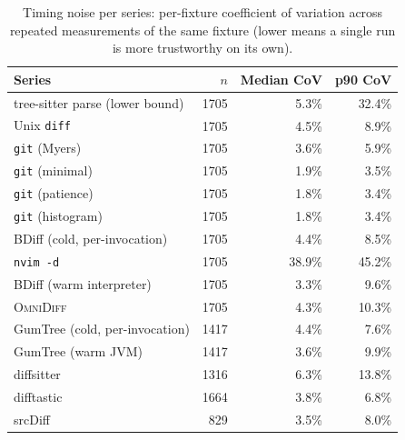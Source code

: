 \begin{table}
  \caption{Timing noise per series: per-fixture coefficient of variation across repeated measurements of the same fixture (lower means a single run is more trustworthy on its own).}
  \label{tab:variance}
  \begin{tabular}{lrrr}
    \toprule
    Series & $n$ & Median CoV & p90 CoV \\
    \midrule
    tree-sitter parse (lower bound) & 1705 & 5.3\% & 32.4\% \\
    Unix \texttt{diff} & 1705 & 4.5\% & 8.9\% \\
    \texttt{git} (Myers) & 1705 & 3.6\% & 5.9\% \\
    \texttt{git} (minimal) & 1705 & 1.9\% & 3.5\% \\
    \texttt{git} (patience) & 1705 & 1.8\% & 3.4\% \\
    \texttt{git} (histogram) & 1705 & 1.8\% & 3.4\% \\
    BDiff (cold, per-invocation) & 1705 & 4.4\% & 8.5\% \\
    \texttt{nvim -d} & 1705 & 38.9\% & 45.2\% \\
    BDiff (warm interpreter) & 1705 & 3.3\% & 9.6\% \\
    \textsc{OmniDiff} & 1705 & 4.3\% & 10.3\% \\
    GumTree (cold, per-invocation) & 1417 & 4.4\% & 7.6\% \\
    GumTree (warm JVM) & 1417 & 3.6\% & 9.9\% \\
    diffsitter & 1316 & 6.3\% & 13.8\% \\
    difftastic & 1664 & 3.8\% & 6.8\% \\
    srcDiff & 829 & 3.5\% & 8.0\% \\
    \bottomrule
  \end{tabular}
\end{table}
